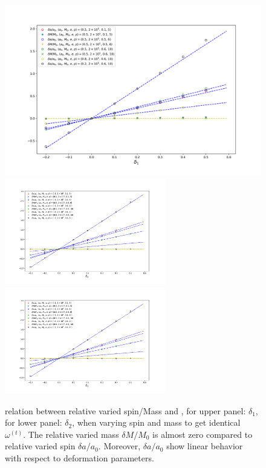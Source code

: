 \documentclass{article}
\begin{document}
	\begin{figure}[!htb]
		\centering
		\includegraphics[width=16cm]{d1_spin_linear.png}
		\includegraphics[width=7cm]{d2_spin_linear.png}
		\includegraphics[width=7cm]{d2_spin_linear.png}
		\caption{relation between relative varied spin/Mass and , for upper panel: $\delta_1$, for lower panel: $\delta_2$, when varying spin and mass to get identical $\omega^{(t)}$. The relative varied mass $\delta M/ M_0$ is almost zero compared to relative varied spin $\delta a/ a_0$. Moreover, $\delta a/ a_0$ show linear behavior with respect to deformation parameters.}
		\label{da_linear}
	\end{figure}
\end{document}
